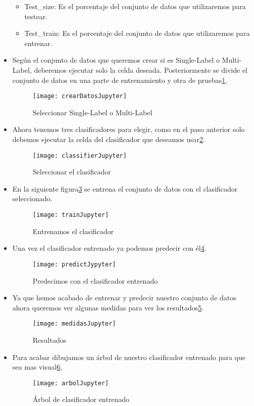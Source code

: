\begin{itemize}
\begin{itemize}
		\item Test\_size: Es el porcentaje del conjunto de datos que utilizaremos para testear.
		\item Test\_train: Es el porcentaje del conjunto de datos que utilizaremos para entrenar.
	\end{itemize}
	\item Según el conjunto de datos que queremos crear si es Single-Label o Multi-Label, deberemos ejecutar solo la celda deseada. Posteriormente se divide el conjunto de datos en una parte de entrenamiento y otra de pruebas\ref{fig:crearDatosJupyter}.
	\begin{figure}
	\centering
	\texttt{[image: crearDatosJupyter]}
	\caption{Seleccionar Single-Label o Multi-Label}
	\label{fig:crearDatosJupyter}
	\end{figure}
  	\item Ahora tenemos tres clasificadores para elegir, como en el paso anterior solo debemos ejecutar la celda del clasificador que deseamos usar\ref{fig:classifierJupyter}.
  	\begin{figure}
	\centering
	\texttt{[image: classifierJupyter]}
	\caption{Seleccionar el clasificador}
	\label{fig:classifierJupyter}
	\end{figure}
	\item En la siguiente figura\ref{fig:trainJupyter} se entrena el conjunto de datos con el clasificador seleccionado.
  	\begin{figure}
	\centering
	\texttt{[image: trainJupyter]}
	\caption{Entrenamos el clasificador}
	\label{fig:trainJupyter}
	\end{figure}
	\item Una vez el clasificador entrenado ya podemos predecir con él\ref{fig:predictJypyter}.
  	\begin{figure}
	\centering
	\texttt{[image: predictJypyter]}
	\caption{Predecimos con el clasificador entrenado}
	\label{fig:predictJypyter}
	\end{figure}
	\item Ya que hemos acabado de entrenar y predecir nuestro conjunto de datos ahora queremos ver algunas medidas para ver los resultados\ref{fig:medidasJupyter}.
  	\begin{figure}
	\centering
	\texttt{[image: medidasJupyter]}
	\caption{Resultados}
	\label{fig:medidasJupyter}
	\end{figure}
	\item Para acabar dibujamos un árbol de nuestro clasificador entrenado para que sea mas visual\ref{fig:arbolJupyter}.
  	\begin{figure}
	\centering
	\texttt{[image: arbolJupyter]}
	\caption{Árbol de clasificador entrenado}
	\label{fig:arbolJupyter}
	\end{figure}
\end{itemize}

